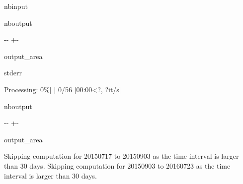 \documentclass[letterpaper,10pt,english]{sphinxmanual}
\begin{document}
\begin{sphinxuseclass}{nbinput}
{\begin{sphinxVerbatim}[commandchars=\\\{\}]
                                          
                                        
                                         
\end{sphinxVerbatim}
}

\end{sphinxuseclass}
\begin{sphinxuseclass}{nboutput}
{

\kern-\sphinxverbatimsmallskipamount\kern-\baselineskip
\kern+\FrameHeightAdjust\kern-\fboxrule
\vspace{\nbsphinxcodecellspacing}

\begin{sphinxuseclass}{output_area}
\begin{sphinxuseclass}{stderr}


\begin{sphinxVerbatim}[commandchars=\\\{\}]
Processing:   0\%|          | 0/56 [00:00<?, ?it/s]
\end{sphinxVerbatim}



\end{sphinxuseclass}
\end{sphinxuseclass}
}

\end{sphinxuseclass}
\begin{sphinxuseclass}{nboutput}
{

\kern-\sphinxverbatimsmallskipamount\kern-\baselineskip
\kern+\FrameHeightAdjust\kern-\fboxrule
\vspace{\nbsphinxcodecellspacing}

\begin{sphinxuseclass}{output_area}
\begin{sphinxuseclass}{}


\begin{sphinxVerbatim}[commandchars=\\\{\}]
Skipping computation for 20150717 to 20150903 as the time interval is larger than 30 days.
Skipping computation for 20150903 to 20160723 as the time interval is larger than 30 days.
\end{sphinxVerbatim}



\end{sphinxuseclass}
\end{sphinxuseclass}
}

\end{sphinxuseclass}
\end{document}
